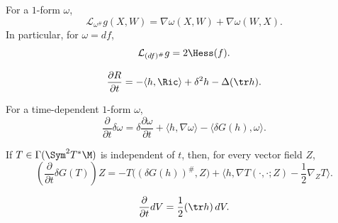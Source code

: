 \begin{remark}
\label{topping:lie-derivative-symmetric-gradient}

For a $1$-form $\omega$,
\[
\mathcal L_{\omega^\#}g(X,W)=\nabla\omega(X,W)+\nabla\omega(W,X).
\]
In particular, for $\omega=df$,
\[
\mathcal L_{(df)^\#}g=2\Hess(f).
\]
\end{remark}

\begin{proposition}
\label{topping:variation-scalar-curvature}

\[
\frac{\partial R}{\partial t}=-\langle h,\Ric\rangle+\delta^2h-\Delta(\tr h).
\]
\end{proposition}

\begin{proposition}
\label{topping:variation-divergence-one-form}

For a time-dependent $1$-form $\omega$,
\[
\frac{\partial}{\partial t}\delta\omega
=\delta\frac{\partial\omega}{\partial t}+\langle h,\nabla\omega\rangle
-\langle\delta G(h),\omega\rangle.
\]
\end{proposition}

\begin{proposition}
\label{topping:variation-divergence-gravitation}

If $T\in\Gamma(\Sym^2T^*\M)$ is independent of $t$, then, for every vector
field $Z$,
\[
\left(\frac{\partial}{\partial t}\delta G(T)\right)Z
=-T\bigl((\delta G(h))^\#,Z\bigr)
+\langle h,\nabla T(\cdot,\cdot;Z)-\frac12\nabla_ZT\rangle.
\]
\end{proposition}

\begin{proposition}
\label{topping:variation-volume-form}


\[
\frac{\partial}{\partial t}dV=\frac12(\tr h)\,dV.
\]
\end{proposition}

